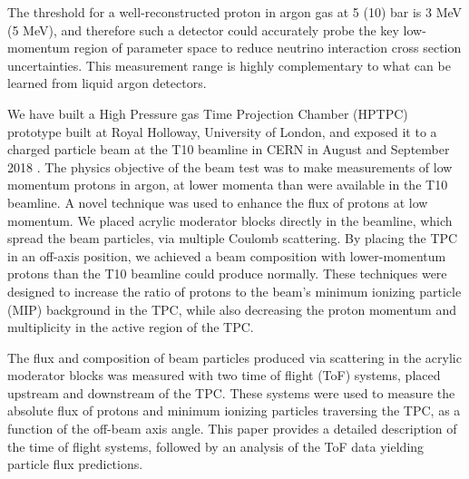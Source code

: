 The threshold for a well-reconstructed proton in argon gas at 5 (10) bar is 3 MeV (5 MeV), and therefore such a detector could accurately probe the key low-momentum region of parameter space to reduce neutrino interaction cross section uncertainties. 
This measurement range is highly complementary to what can be learned from liquid argon detectors. 

We have built a High Pressure gas Time Projection Chamber (HPTPC) prototype built at Royal Holloway, University of London, and exposed it to a charged particle beam at the T10 beamline in CERN in August and September 2018 \cite{SPSC-P-355}.
The physics objective of the beam test was to make measurements of low momentum protons in argon, at lower momenta than were available in the T10 beamline. 
A novel technique was used to enhance the flux of protons at low momentum.
We placed acrylic moderator blocks directly in the beamline, which spread the beam particles, via multiple Coulomb scattering.
By placing the TPC in an off-axis position, we achieved a beam composition with lower-momentum protons than the T10 beamline could produce normally.
These techniques were designed to increase the ratio of protons to the beam's minimum ionizing particle (MIP) background in the TPC, while also decreasing the proton momentum and multiplicity in the active region of the TPC.

The flux and composition of beam particles produced via scattering in the acrylic moderator blocks was measured with two time of flight (ToF) systems, placed upstream and downstream of the TPC.
These systems were used to measure the absolute flux of protons and minimum ionizing particles traversing the TPC, as a function of the off-beam axis angle.
This paper provides a detailed description of the time of flight systems, followed by an analysis of the ToF data yielding particle flux predictions.